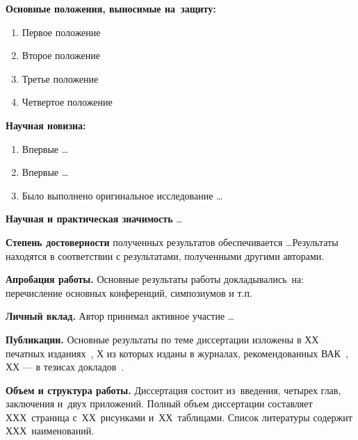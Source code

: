 \textbf{Основные положения, выносимые на~защиту:}
\begin{enumerate}
  \item Первое положение
  \item Второе положение
  \item Третье положение
  \item Четвертое положение
\end{enumerate}

\textbf{Научная новизна:}
\begin{enumerate}
  \item Впервые \ldots
  \item Впервые \ldots
  \item Было выполнено оригинальное исследование \ldots
\end{enumerate}

\textbf{Научная и практическая значимость} \ldots

\textbf{Степень достоверности} полученных результатов обеспечивается \ldots Результаты находятся в соответствии с результатами, полученными другими авторами.

\textbf{Апробация работы.}
Основные результаты работы докладывались~на:
перечисление основных конференций, симпозиумов и т.п.

\textbf{Личный вклад.} Автор принимал активное участие \ldots

\textbf{Публикации.} Основные результаты по теме диссертации изложены в ХХ печатных изданиях~\cite{bib1,bib2,bib3,bib4,bib5},
Х из которых изданы в журналах, рекомендованных ВАК~\cite{bib1,bib2,bib3}, 
ХХ --- в тезисах докладов~\cite{bib4,bib5}.

\textbf{Объем и структура работы.} Диссертация состоит из~введения, четырех глав, заключения и~двух приложений. Полный объем диссертации составляет ХХХ~страница с~ХХ~рисунками и~ХХ~таблицами. Список литературы содержит ХХХ~наименований.

\clearpage